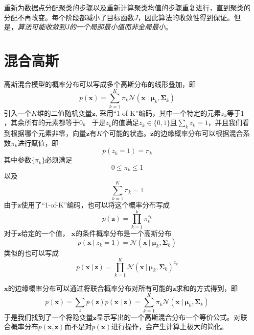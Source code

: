 \documentclass[11pt]{ctexbook}
\begin{document}
重新为数据点分配聚类的步骤以及重新计算聚类均值的步骤重复进行，直到聚类的分配不再改变。每个阶段都减小了目标函数$J$，因此算法的收敛性得到保证。但是，\emph{算法可能收敛到$J$的一个局部最小值而非全局最小}。

\section{混合高斯}
高斯混合模型的概率分布可以写成多个高斯分布的线形叠加，即
\begin{equation}
	p(\bm x) = \sum_{k=1}^{K}\pi_k\mathcal N(\bm x\ | \ \bm \mu_k, \bm \Sigma_k)
\end{equation}
引入一个$K$维的二值随机变量$\bm z$, 采用“1-of-K”编码，其中一个特定的元素$z_k$等于$1$，其余所有的元素都等于$0$。 于是$z_k$的值满足$z_k \in \{0, 1\}$且$\sum_k z_k = 1$，并且我们看到根据哪个元素非零，向量$\bm z$有$K$个可能的状态。$\bm z$的边缘概率分布可以根据混合系数$\pi_k$进行赋值，即
\begin{equation}
	p(z_k=1) = \pi_k
\end{equation}
其中参数$\{\pi_k\}$必须满足
\begin{equation}
	0 \leqslant \pi_k \leqslant 1
\end{equation}
以及
\begin{equation}
	\sum_{k=1}^{K} \pi_k = 1
\end{equation}
由于$\bm z$使用了“1-of-K”编码，也可以将这个概率分布写成
\begin{equation}
	p(\bm z) = \prod_{k=1}^{k}\pi_k^{z_k}
\end{equation}
对于$\bm z$给定的一个值， $\bm x$的条件概率分布是一个高斯分布
\begin{equation}
	p(\bm x\ |\  z_k= 1) = \mathcal N (\bm x\ |\ \bm \mu_k, \bm \Sigma_k )
\end{equation}
类似的也可以写成
\begin{equation}
	p(\bm x \ | \ \bm z) = \prod_{k=1}^{K} \mathcal N (\bm x \ |\ \bm \mu_k, \bm \Sigma_k ) ^ {z_k}
\end{equation}

$\bm x $的边缘概率分布可以通过将联合概率分布对所有可能的$\bm z$求和的方式得到，即
\begin{equation}
	p(\bm x) = \sum_z p(\bm z)p(\bm x \ |\ \bm z) = \sum_{k=1}^{K}\pi_k \mathcal N(\bm x \ |\ \bm \mu_k, \bm \Sigma_k)
\end{equation}
于是我们找到了一个将隐变量$\bm z$显示写出的一个高斯混合分布一个等价公式。对联合概率分布$p(\bm x, \bm z)$而不是对$p(\bm x)$进行操作，会产生计算上极大的简化。
\end{document}
